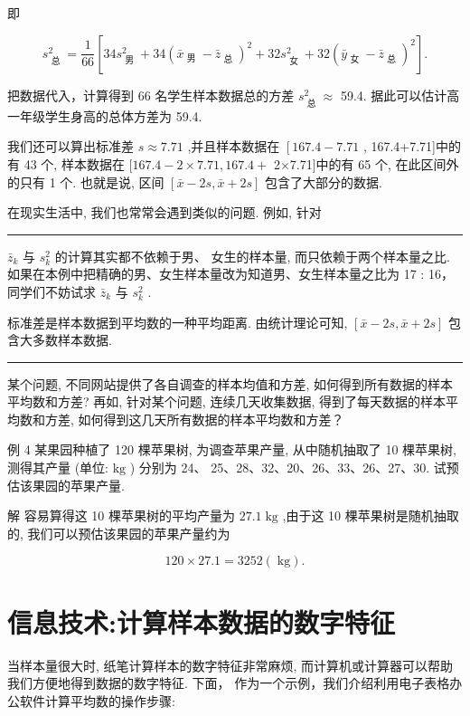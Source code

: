 \documentclass[10pt]{article}
\newcommand{\HRule}{\begin{center}\rule{0.9\linewidth}{0.2mm}\end{center}}
\begin{document}
即

\[
{s}_{\text{ 总 }}^{2} = \frac{1}{66}\left\lbrack  {{34}{s}_{\text{ 男 }}^{2} + {34}{\left( {\bar{x}}_{\text{ 男 }} - {\bar{z}}_{\text{ 总 }}\right) }^{2} + {32}{s}_{\text{ 女 }}^{2} + {32}{\left( {\bar{y}}_{\text{ 女 }} - {\bar{z}}_{\text{ 总 }}\right) }^{2}}\right\rbrack  .
\]

把数据代入，计算得到 66 名学生样本数据总的方差 \({s}_{\text{ 总 }}^{2} \approx\) 59.4. 据此可以估计高一年级学生身高的总体方差为 59.4.

我们还可以算出标准差 \(s \approx  {7.71}\) ,并且样本数据在 \(\left\lbrack  {{167.4} - {7.71}}\right.\) , 167.4+7.71]中的有 43 个, 样本数据在 \(\lbrack {167.4} - 2 \times  {7.71},{167.4} +\) 2×7.71]中的有 65 个, 在此区间外的只有 1 个. 也就是说, 区间 \(\left\lbrack  {\bar{x} - {2s},\bar{x} + {2s}}\right\rbrack\) 包含了大部分的数据.

在现实生活中, 我们也常常会遇到类似的问题. 例如, 针对



\HRule

\({\bar{z}}_{k}\) 与 \({s}_{k}^{2}\) 的计算其实都不依赖于男、 女生的样本量, 而只依赖于两个样本量之比. 如果在本例中把精确的男、女生样本量改为知道男、女生样本量之比为 17 : 16，同学们不妨试求 \({\bar{z}}_{k}\) 与 \({s}_{k}^{2}\) .

标准差是样本数据到平均数的一种平均距离. 由统计理论可知, \(\left\lbrack  {\bar{x} - {2s},\bar{x} + {2s}}\right\rbrack\) 包含大多数样本数据.

\HRule

某个问题, 不同网站提供了各自调查的样本均值和方差, 如何得到所有数据的样本平均数和方差? 再如, 针对某个问题, 连续几天收集数据, 得到了每天数据的样本平均数和方差, 如何得到这几天所有数据的样本平均数和方差？

例 4 某果园种植了 120 棵苹果树, 为调查苹果产量, 从中随机抽取了 10 棵苹果树, 测得其产量 (单位: \(\mathrm{{kg}}\) ) 分别为 24、 25、28、32、20、26、33、26、27、30. 试预估该果园的苹果产量.

解 容易算得这 10 棵苹果树的平均产量为 \({27.1}\mathrm{\;{kg}}\) ,由于这 10 棵苹果树是随机抽取的, 我们可以预估该果园的苹果产量约为

\[
{120} \times  {27.1} = {3252}\left( \mathrm{\;{kg}}\right) .
\]

\section*{信息技术:计算样本数据的数字特征}

当样本量很大时, 纸笔计算样本的数字特征非常麻烦, 而计算机或计算器可以帮助我们方便地得到数据的数字特征. 下面， 作为一个示例，我们介绍利用电子表格办公软件计算平均数的操作步骤:
\end{document}
